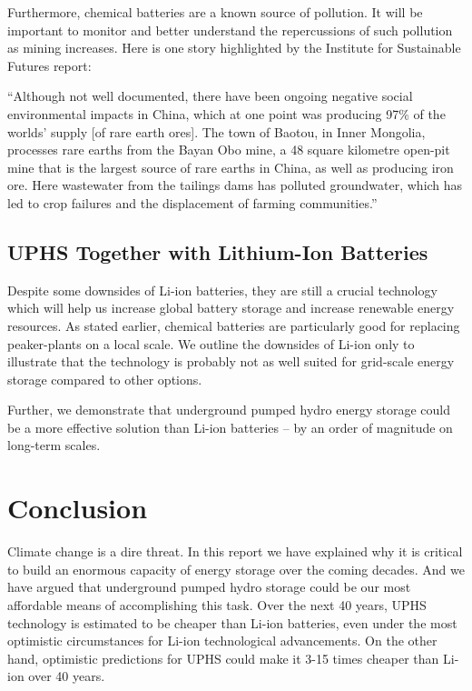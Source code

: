 \documentclass[hidelinks,12pt,a4paper]{article}
\begin{document}
Furthermore, chemical batteries are a known source of pollution. It will be important to monitor and better understand the repercussions of such pollution as mining increases. Here is one story highlighted by the Institute for Sustainable Futures report:

\begin{displayquote}
“Although not well documented, there have been ongoing negative social environmental impacts in China, which at one point was producing 97\% of the worlds’ supply [of rare earth ores]. The town of Baotou, in Inner Mongolia, processes rare earths from the Bayan Obo mine, a 48 square kilometre open-pit mine that is the largest source of rare earths in China, as well as producing iron ore. Here wastewater from the tailings dams has polluted groundwater, which has led to crop failures and the displacement of farming communities.” \cite{ResponsibleMineralsSourcingForRenewableEnergy}
\end{displayquote}

\subsection{UPHS Together with Lithium-Ion Batteries}
Despite some downsides of Li-ion batteries, they are still a crucial technology which will help us increase global battery storage and increase renewable energy resources. As stated earlier, chemical batteries are particularly good for replacing peaker-plants on a local scale. We outline the downsides of Li-ion only to illustrate that the technology is probably not as well suited for grid-scale energy storage compared to other options.

Further, we demonstrate that underground pumped hydro energy storage could be a more effective solution than Li-ion batteries -- by an order of magnitude on long-term scales.

\pagebreak[4]
\section{Conclusion}
Climate change is a dire threat. In this report we have explained why it is critical to build an enormous capacity of energy storage over the coming decades. And we have argued that underground pumped hydro storage could be our most affordable means of accomplishing this task. Over the next 40 years, UPHS technology is estimated to be cheaper than Li-ion batteries, even under the most optimistic circumstances for Li-ion technological advancements. On the other hand, optimistic predictions for UPHS could make it 3-15 times cheaper than Li-ion over 40 years.
\end{document}
